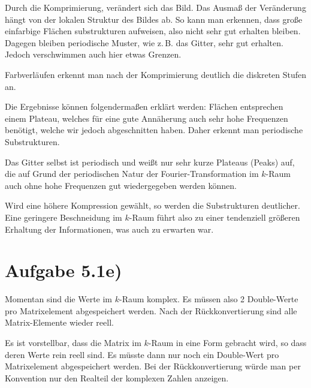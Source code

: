 Durch die Komprimierung, verändert sich das Bild. Das Ausmaß der Veränderung
hängt von der lokalen Struktur des Bildes ab. So kann man erkennen, dass
große einfarbige Flächen substrukturen aufweisen, also nicht sehr gut erhalten
bleiben. Dagegen bleiben periodische Muster, wie z.\,B. das Gitter, sehr gut
erhalten. Jedoch verschwimmen auch hier etwas Grenzen.

Farbverläufen erkennt man nach der Komprimierung deutlich die diskreten Stufen an.

Die Ergebnisse können folgendermaßen erklärt werden: Flächen entsprechen einem Plateau,
welches für eine gute Annäherung auch sehr hohe Frequenzen benötigt, welche wir jedoch
abgeschnitten haben. Daher erkennt man periodische Substrukturen.

Das Gitter selbst ist periodisch und weißt nur sehr kurze Plateaus (Peaks) auf, die auf Grund
der periodischen Natur der Fourier-Transformation im $k$-Raum auch ohne hohe Frequenzen
gut wiedergegeben werden können.

Wird eine höhere Kompression gewählt, so werden die Substrukturen deutlicher.
Eine geringere Beschneidung im $k$-Raum führt also zu einer tendenziell größeren
Erhaltung der Informationen, was auch zu erwarten war.

\section*{Aufgabe 5.1e)}

Momentan sind die Werte im $k$-Raum komplex. Es müssen also 2 Double-Werte pro Matrixelement
abgespeichert werden. Nach der Rückkonvertierung sind alle Matrix-Elemente wieder reell.

Es ist vorstellbar, dass die Matrix im $k$-Raum in eine Form gebracht wird, so dass deren Werte
rein reell sind. Es müsste dann nur noch ein Double-Wert pro Matrixelement abgespeichert werden.
Bei der Rückkonvertierung würde man per Konvention nur den Realteil der komplexen
Zahlen anzeigen.